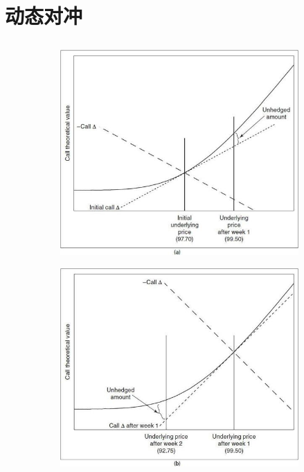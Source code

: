 \chapter{动态对冲}
\section{}
\subsection{}

\begin{figure}
    \centering
    \begin{subfigure}{0.45\textwidth}
        \includegraphics[width=\textwidth]{../img/fig8-3a.png}
        \label{fig8-3a}
    \end{subfigure}
    \hfill
    \begin{subfigure}{0.45\textwidth}
        \includegraphics[width=\textwidth]{../img/fig8-3b.png}

\end{subfigure}
\end{figure}
